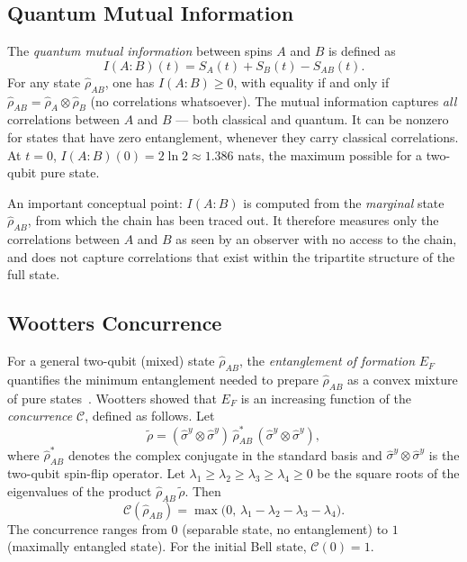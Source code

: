 \documentclass[12pt,a4paper]{article}
\newcommand{\rhohat}{\hat{\rho}}
\newcommand{\sigy}{\hat{\sigma}^y}
\begin{document}
\subsection{Quantum Mutual Information}
\label{subsec:mi}

The \emph{quantum mutual information} between spins $A$ and $B$ is defined as
\begin{equation}
  I(A{:}B)(t) = S_A(t) + S_B(t) - S_{AB}(t).
  \label{eq:mi}
\end{equation}
For any state $\rhohat_{AB}$, one has $I(A{:}B) \geq 0$, with equality if and
only if $\rhohat_{AB} = \rhohat_A\otimes\rhohat_B$ (no correlations whatsoever).
The mutual information captures \emph{all} correlations between $A$ and $B$ —
both classical and quantum.  It can be nonzero for states that have zero
entanglement, whenever they carry classical correlations.  At $t=0$,
$I(A{:}B)(0) = 2\ln2 \approx 1.386$ nats, the maximum possible for a two-qubit
pure state.

An important conceptual point: $I(A{:}B)$ is computed from the \emph{marginal}
state $\rhohat_{AB}$, from which the chain has been traced out.  It therefore
measures only the correlations between $A$ and $B$ as seen by an observer with
no access to the chain, and does not capture correlations that exist within the
tripartite structure of the full state.

\subsection{Wootters Concurrence}
\label{subsec:concurrence}

For a general two-qubit (mixed) state $\rhohat_{AB}$, the \emph{entanglement of
formation} $E_F$ quantifies the minimum entanglement needed to prepare
$\rhohat_{AB}$ as a convex mixture of pure states~\cite{NielsenChuang2000}.
Wootters showed that $E_F$ is an increasing function of the \emph{concurrence}
$\mathcal{C}$, defined as follows.  Let
\begin{equation}
  \tilde{\rho} = (\sigy\otimes\sigy)\,\rhohat_{AB}^*\,(\sigy\otimes\sigy),
  \label{eq:rhotilde}
\end{equation}
where $\rhohat_{AB}^*$ denotes the complex conjugate in the standard basis and
$\sigy\otimes\sigy$ is the two-qubit spin-flip operator.  Let
$\lambda_1\geq\lambda_2\geq\lambda_3\geq\lambda_4\geq0$ be the square roots of
the eigenvalues of the product $\rhohat_{AB}\,\tilde{\rho}$.  Then
\begin{equation}
  \mathcal{C}(\rhohat_{AB}) = \max\!\bigl(0,\,\lambda_1-\lambda_2-\lambda_3-\lambda_4\bigr).
  \label{eq:concurrence}
\end{equation}
The concurrence ranges from $0$ (separable state, no entanglement) to $1$
(maximally entangled state).  For the initial Bell state,
$\mathcal{C}(0) = 1$.
\end{document}
